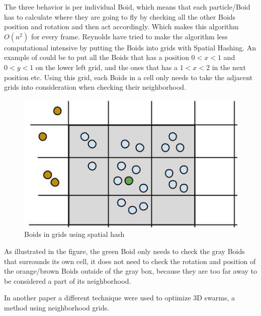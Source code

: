 The three behavior is per individual Boid, which means that each particle/Boid has to calculate where they are going to fly by checking all the other Boids position and rotation and then act accordingly. Which makes this algorithm $ O(n^2)$ for every frame. 
 Reynolds have tried to make the algorithm less computational intensive by putting the Boids into grids with Spatial Hashing. An example of could be to put all the Boids that has a position $0<x<1$ and $0<y<1$ on the lower left grid, and the ones that has a $1<x<2$ in the next position etc. Using this grid, each Boids in a cell only needs to take the adjacent grids into consideration when checking their neighborhood. 
\begin{figure}[h!]
    \centering
    \includegraphics[width=0.8\linewidth]{images/boid_spatialhash}
    \caption{Boids in grids using spatial hash}
\end{figure}
As illustrated in the figure, the green Boid only needs to check the gray Boids that surrounds its own cell, it does not need to check the rotation and position of the orange/brown Boids outside of the gray box, because they are too far away to be considered a part of its neighborhood.

In another paper a different technique were used to optimize 3D swarms, a method using neighborhood grids.\\

